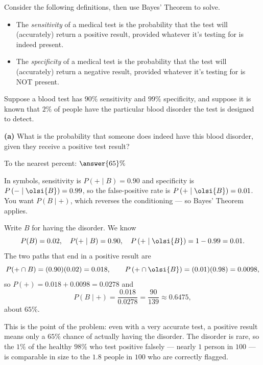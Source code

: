 \documentclass[12pt]{ximera}
\begin{document}
\begin{problem}
Consider the following definitions, then use Bayes' Theorem to solve.
\begin{itemize}
    \item The \emph{sensitivity} of a medical test is the probability that the test
      will (accurately) return a positive result, provided whatever it's testing for
      is indeed present.
    \item The \emph{specificity} of a medical test is the probability that the test
      will (accurately) return a negative result, provided whatever it's testing for
      is NOT present.
\end{itemize}

Suppose a blood test has $90\%$ sensitivity and $99\%$ specificity, and suppose it is
known that $2\%$ of people have the particular blood disorder the test is designed to
detect.

\begin{prompt}
\textbf{(a)} What is the probability that someone does indeed have this blood
disorder, given they receive a positive test result?

To the nearest percent: $\answer{65}\%$

\begin{hint}
In symbols, sensitivity is $P(+\mid B)=0.90$ and specificity is
$P\left(-\mid\olsi{B}\right)=0.99$, so the false-positive rate is
$P\left(+\mid\olsi{B}\right)=0.01$. You want $P(B\mid +)$, which reverses the
conditioning --- so Bayes' Theorem applies.
\end{hint}

\begin{feedback}
Write $B$ for having the disorder. We know
\[
P(B)=0.02,\quad P(+\mid B)=0.90,\quad P\left(+\mid\olsi{B}\right)=1-0.99=0.01.
\]
The two paths that end in a positive result are
\[
P(+\cap B)=(0.90)(0.02)=0.018, \qquad
P\left(+\cap\olsi{B}\right)=(0.01)(0.98)=0.0098,
\]
so $P(+)=0.018+0.0098=0.0278$ and
\[
P(B\mid +)=\frac{0.018}{0.0278}=\frac{90}{139}\approx 0.6475,
\]
about $65\%$.

This is the point of the problem: even with a very accurate test, a positive result
means only a $65\%$ chance of actually having the disorder. The disorder is rare, so
the $1\%$ of the healthy $98\%$ who test positive falsely --- nearly $1$ person in
$100$ --- is comparable in size to the $1.8$ people in $100$ who are correctly
flagged.
\end{feedback}
\end{prompt}


\end{problem}
\end{document}
